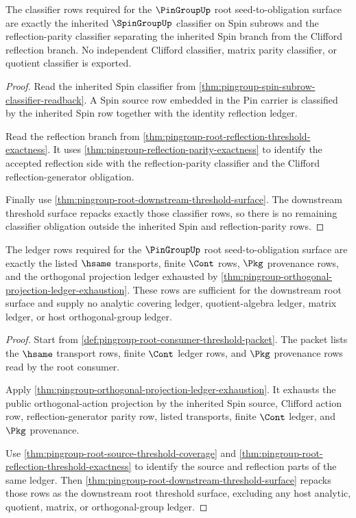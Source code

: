\begin{theorem}
\label{thm:pingroup-root-classifier-obligation-scope}
The classifier rows required for the $\PinGroupUp$ root
seed-to-obligation surface are exactly the inherited $\SpinGroupUp$ classifier
on Spin subrows and the reflection-parity classifier separating the inherited
Spin branch from the Clifford reflection branch. No independent Clifford
classifier, matrix parity classifier, or quotient classifier is exported.
\end{theorem}
\begin{proof}
Read the inherited Spin classifier from
\autoref{thm:pingroup-spin-subrow-classifier-readback}. A Spin source row
embedded in the Pin carrier is classified by the inherited Spin row together
with the identity reflection ledger.

Read the reflection branch from
\autoref{thm:pingroup-root-reflection-threshold-exactness}. It uses
\autoref{thm:pingroup-reflection-parity-exactness} to identify the accepted
reflection side with the reflection-parity classifier and the Clifford
reflection-generator obligation.

Finally use \autoref{thm:pingroup-root-downstream-threshold-surface}. The
downstream threshold surface repacks exactly those classifier rows, so there
is no remaining classifier obligation outside the inherited Spin and
reflection-parity rows.
\end{proof}

\begin{theorem}
\label{thm:pingroup-root-ledger-obligation-scope}
The ledger rows required for the $\PinGroupUp$ root seed-to-obligation surface
are exactly the listed $\hsame$ transports, finite $\Cont$ rows, $\Pkg$
provenance rows, and the orthogonal projection ledger exhausted by
\autoref{thm:pingroup-orthogonal-projection-ledger-exhaustion}. These rows
are sufficient for the downstream root surface and supply no analytic
covering ledger, quotient-algebra ledger, matrix ledger, or host
orthogonal-group ledger.
\end{theorem}
\begin{proof}
Start from \autoref{def:pingroup-root-consumer-threshold-packet}. The packet
lists the $\hsame$ transport rows, finite $\Cont$ ledger rows, and $\Pkg$
provenance rows read by the root consumer.

Apply \autoref{thm:pingroup-orthogonal-projection-ledger-exhaustion}. It
exhausts the public orthogonal-action projection by the inherited Spin source,
Clifford action row, reflection-generator parity row, listed transports,
finite $\Cont$ ledger, and $\Pkg$ provenance.

Use \autoref{thm:pingroup-root-source-threshold-coverage} and
\autoref{thm:pingroup-root-reflection-threshold-exactness} to identify the
source and reflection parts of the same ledger. Then
\autoref{thm:pingroup-root-downstream-threshold-surface} repacks those rows
as the downstream root threshold surface, excluding any host analytic,
quotient, matrix, or orthogonal-group ledger.
\end{proof}


